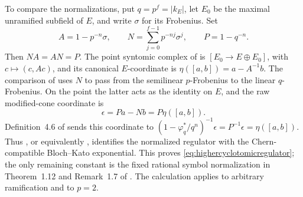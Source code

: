 To compare the normalizations, put $q=p^f=|k_E|$, let $E_0$ be the
maximal unramified subfield of $E$, and write $\sigma$ for its Frobenius.
Set
\[
 A=1-p^{-n}\sigma,\qquad
 N=\sum_{j=0}^{f-1}p^{-nj}\sigma^j,\qquad P=1-q^{-n}.
\]
Then $NA=AN=P$.  The point syntomic complex of
\cite[Example~2.2.4]{HuberKings} is
$[E_0\longrightarrow E\oplus E_0]$, with
$c\mapsto(c,Ac)$, and its canonical $E$-coordinate is
$\eta([a,b])=a-A^{-1}b$.
The comparison of \cite[Proposition~8.6(2)--(3)]{BesserRegulators}
uses $N$ to pass from the semilinear $p$-Frobenius to the linear
$q$-Frobenius.  On the point the latter acts as the identity on $E$,
and the raw modified-cone coordinate is
\[
 \epsilon=Pa-Nb=P\eta([a,b]).
\]
Definition~4.6 of \cite{BesserDeJeu} sends this coordinate to
$(1-\varphi_q^*/q^n)^{-1}\epsilon=P^{-1}\epsilon=\eta([a,b])$.
Thus \cite[Corollary~9.10 and Proposition~9.11]{BesserRegulators},
or equivalently \cite[Proposition~2.3.4]{HuberKings}, identifies the
normalized regulator with the Chern-compatible Bloch--Kato
exponential.  This proves \eqref{eq:highercyclotomicregulator};
the only remaining constant is the fixed rational symbol normalization
in Theorem~1.12 and Remark~1.7 of \cite{BesserDeJeu}.
The calculation applies to arbitrary ramification and to $p=2$.
